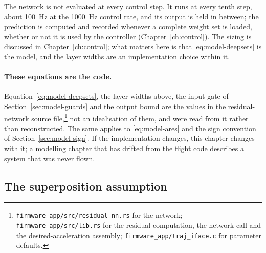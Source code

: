 The network is not evaluated at every control step. It runs at every tenth step, about
\SI{100}{\hertz} at the \SI{1000}{\hertz} control rate, and its output is held in between; the
prediction is computed and recorded whenever a complete weight set is loaded, whether or not it is
used by the controller (Chapter~\ref{ch:control}). The sizing is discussed in
Chapter~\ref{ch:control}; what matters here is that \eqref{eq:model-deepsets} is the model, and the
layer widths are an implementation choice within it.

\paragraph{These equations are the code.} Equation~\eqref{eq:model-deepsets}, the layer widths
above, the input gate of Section~\ref{sec:model-guards} and the output bound are the values
in the residual-network source file,\footnote{\texttt{firmware\_app/src/residual\_nn.rs} for the
network; \texttt{firmware\_app/src/lib.rs} for the residual computation, the network call and the
desired-acceleration assembly; \texttt{firmware\_app/traj\_iface.c} for parameter defaults.} not an
idealisation of them, and were read from it rather than
reconstructed. The same applies to \eqref{eq:model-ares} and the sign convention of
Section~\ref{sec:model-sign}. If the implementation changes,
this chapter changes with it; a modelling chapter that has drifted from the flight code describes a
system that was never flown.

\subsection{The superposition assumption}
\label{sec:model-superposition}

